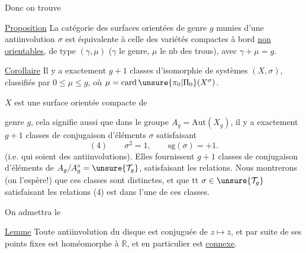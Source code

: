 Donc on trouve


\uline{Proposition} La catégorie des surfaces orientées  de genre $g$ munies d'une antiinvolution $\sigma$ est équivalente à celle des variétés compactes à bord \uline{non orientables}, de type $(\gamma,\mu)$ ($\gamma$ le genre, $\mu$ le nb des trous), avec $\gamma+\mu=g$.


\uline{Corollaire} Il y a exactement $g+1$ classes d'isomorphie de systèmes $(X,\sigma)$, classifiés par $0\leq\mu\leq g$, où $\mu=\operatorname{card}\unsure{\pi_0|\Pi_0}(X^\sigma)$.


$X$  est une surface orientée compacte de


genre $g$, cela signifie aussi que dans le groupe $A_g=\mathrm{Aut}(X_g)$, il y a exactement $g+1$ classes de conjugaison d'éléments $\sigma$ satisfaisant
\[
(4)\qquad \sigma^2=1,\qquad \mathrm{sg}(\sigma)=+1.
\]
(i.e. qui soient des antiinvolutions). Elles fournissent $g+1$ classes de conjugaison d'éléments de $A_g/A_g^\circ=\unsure{\mathcal{T}_g}$, satisfaisant les  relations. Nous montrerons (on l'espère!) que ces classes sont distinctes, et que tt $\sigma\in\unsure{\mathcal{T}_g}$ satisfaisant les relations (4) est dans l'une de ces classes.

On admettra le

\uline{Lemme} Toute antiinvolution du disque   est conjuguée de $z\mapsto\overline z$, et par suite  de ses points fixes est homéomorphe à $\mathbb R$, et en particulier est \uline{connexe}.

